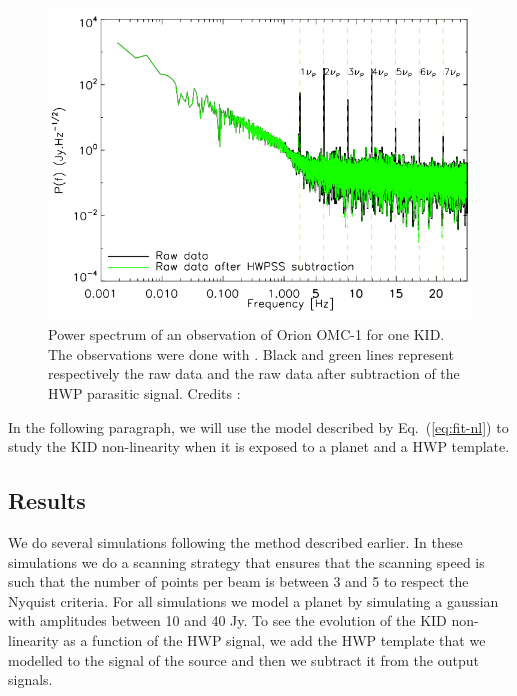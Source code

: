 \begin{figure}[h]
\center
\includegraphics[scale=0.8]{Figures/hwp_power_spectrum.png}
\caption{Power spectrum of an observation of Orion OMC-1 for one KID. The observations were done with \nika . Black and green lines represent respectively the raw data and the raw data after subtraction of the HWP parasitic signal. Credits : \citet{2017A&A...599A..34R} }
\label{fig:hwp_power_spectrum}
\end{figure}

In the following paragraph, we will use the model described by Eq.~(\ref{eq:fit-nl}) to study the KID non-linearity when it is exposed to a planet and a HWP template.

\subsection{Results}

We do several simulations following the method described earlier. In these simulations we do a scanning strategy that ensures that the scanning speed is such that the number of points per beam is between 3 and 5 to respect the Nyquist criteria. For all simulations we model a planet by simulating a gaussian with amplitudes between 10 and 40 Jy. To see the evolution of the KID non-linearity as a function of the HWP signal, we add the HWP template that we modelled to the signal of the source and then we subtract it from the output signals.\\


